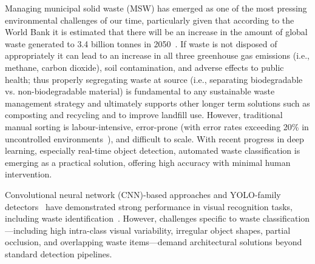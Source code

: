 \documentclass[runningheads]{llncs}
\begin{document}
Managing municipal solid waste (MSW) has emerged as one of the most pressing environmental challenges of our time, particularly given that according to the World Bank it is estimated that there will be an increase in the amount of global waste generated to 3.4 billion tonnes in 2050~\cite{worldbank2018}. If waste is not disposed of appropriately it can lead to an increase in all three greenhouse gas emissions (i.e., methane, carbon dioxide), soil contamination, and adverse effects to public health; thus properly segregating waste at source (i.e., separating biodegradable vs. non-biodegradable material) is fundamental to any sustainable waste management strategy and ultimately supports other longer term solutions such as composting and recycling and to improve landfill use. However, traditional manual sorting is labour-intensive, error-prone (with error rates exceeding 20\% in uncontrolled environments~\cite{systematic_review2025}), and difficult to scale. With recent progress in deep learning, especially real-time object detection, automated waste classification is emerging as a practical solution, offering high accuracy with minimal human intervention.

Convolutional neural network (CNN)-based approaches and YOLO-family
detectors~\cite{redmon2016yolo} have demonstrated strong performance in visual recognition
tasks, including waste identification~\cite{yolo_ec,ecodetect}.
However, challenges specific to waste classification—including high
intra-class visual variability, irregular object shapes, partial
occlusion, and overlapping waste items—demand architectural solutions
beyond standard detection pipelines.
\end{document}
